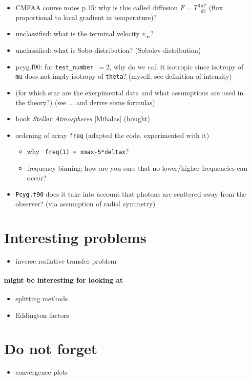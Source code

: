 \documentclass[../main/main.tex]{subfiles}
\begin{document}
\begin{itemize}
\item CMFAA course notes p.15: why is this called diffusion $F=T^3 \frac{dT}{dx}$ (flux proportional to local gradient in temperature)?

\item unclassified: what is the terminal velocity $v_{\infty}$?

\item unclassified: what is Sobo-distribution? (Sobolev distribution)

\item pcyg.f90: for \texttt{test\_number $= 2$}, why do we call it isotropic since isotropy of \texttt{mu} does not imply isotropy of \texttt{theta}? (myself, see definition of intensity)

\item (for which star are the exerpimental data and what assumptions are used in the theory?) (see ... and derive some formulas)

\item book \textit{Stellar Atmospheres} [Mihalas] (bought)

\item ordening of array \texttt{freq} (adapted the code, experimented with it)
\begin{itemize}
\item why \texttt{ freq(1) = xmax-5*deltax}?   
\item frequency binning: how are you sure that no lower/higher frequencies can occur?
\\
\noindent{}
\end{itemize}

\item \texttt{Pcyg.f90} does it take into account that photons are scattered away from the observer? (via assumption of radial symmetry)

\end{itemize}

\newpage
\section{Interesting problems}
\begin{itemize}
\item inverse radiative transfer problem
\end{itemize}

\paragraph{might be interesting for looking at}
\begin{itemize}
\item splitting methods
\item Eddington factors
\end{itemize}

\section{Do not forget}
\begin{itemize}
\item convergence plots
\end{itemize}
\end{document}
